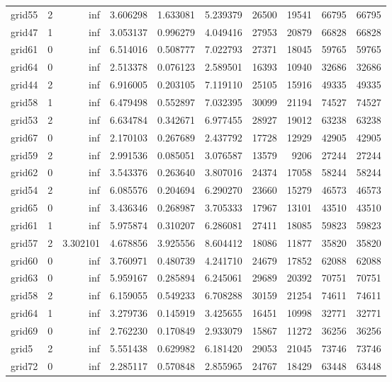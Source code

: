 \begin{longtable}{|l|r|r|r|r|r|r|r|r|r|}
grid55 & 2 & inf & 3.606298 & 1.633081 & 5.239379 & 26500 & 19541 & 66795 & 66795 \\
grid47 & 1 & inf & 3.053137 & 0.996279 & 4.049416 & 27953 & 20879 & 66828 & 66828 \\
grid61 & 0 & inf & 6.514016 & 0.508777 & 7.022793 & 27371 & 18045 & 59765 & 59765 \\
grid64 & 0 & inf & 2.513378 & 0.076123 & 2.589501 & 16393 & 10940 & 32686 & 32686 \\
grid44 & 2 & inf & 6.916005 & 0.203105 & 7.119110 & 25105 & 15916 & 49335 & 49335 \\
grid58 & 1 & inf & 6.479498 & 0.552897 & 7.032395 & 30099 & 21194 & 74527 & 74527 \\
grid53 & 2 & inf & 6.634784 & 0.342671 & 6.977455 & 28927 & 19012 & 63238 & 63238 \\
grid67 & 0 & inf & 2.170103 & 0.267689 & 2.437792 & 17728 & 12929 & 42905 & 42905 \\
grid59 & 2 & inf & 2.991536 & 0.085051 & 3.076587 & 13579 & 9206 & 27244 & 27244 \\
grid62 & 0 & inf & 3.543376 & 0.263640 & 3.807016 & 24374 & 17058 & 58244 & 58244 \\
grid54 & 2 & inf & 6.085576 & 0.204694 & 6.290270 & 23660 & 15279 & 46573 & 46573 \\
grid65 & 0 & inf & 3.436346 & 0.268987 & 3.705333 & 17967 & 13101 & 43510 & 43510 \\
grid61 & 1 & inf & 5.975874 & 0.310207 & 6.286081 & 27411 & 18085 & 59823 & 59823 \\
grid57 & 2 & 3.302101 & 4.678856 & 3.925556 & 8.604412 & 18086 & 11877 & 35820 & 35820 \\
grid60 & 0 & inf & 3.760971 & 0.480739 & 4.241710 & 24679 & 17852 & 62088 & 62088 \\
grid63 & 0 & inf & 5.959167 & 0.285894 & 6.245061 & 29689 & 20392 & 70751 & 70751 \\
grid58 & 2 & inf & 6.159055 & 0.549233 & 6.708288 & 30159 & 21254 & 74611 & 74611 \\
grid64 & 1 & inf & 3.279736 & 0.145919 & 3.425655 & 16451 & 10998 & 32771 & 32771 \\
grid69 & 0 & inf & 2.762230 & 0.170849 & 2.933079 & 15867 & 11272 & 36256 & 36256 \\
grid5 & 2 & inf & 5.551438 & 0.629982 & 6.181420 & 29053 & 21045 & 73746 & 73746 \\
grid72 & 0 & inf & 2.285117 & 0.570848 & 2.855965 & 24767 & 18429 & 63448 & 63448 \\

\end{longtable}
